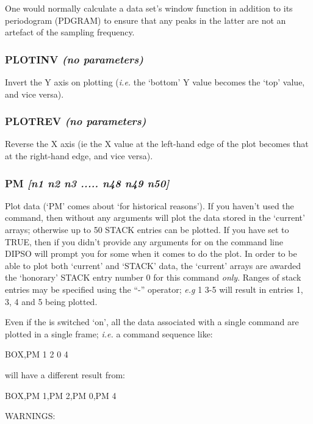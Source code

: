 \documentclass[twoside,11pt,noabs,nolof]{starlink}
\providecommand{\dipcom}[3]{\subsubsection*{\label{COM:#1}\xlabel{COM:#1}\textbf{#1} \emph{#2}}}
\begin{document}
One would normally calculate a data set's window function in addition
to its periodogram (PDGRAM) to ensure that any peaks in the latter are
not an artefact of the sampling frequency.

\dipcom{PLOTINV}{(no parameters)}{Causes the Y axis of subsequent plots to be inverted}
Invert the Y axis on plotting (\emph{i.e.} the `bottom' Y value becomes
the `top' value, and vice versa).

\dipcom{PLOTREV}{(no parameters)}{Causes the X axis of subsequent plots to be reversed}
Reverse the X axis (ie the X value at the left-hand edge of the plot
becomes that at the right-hand edge, and vice versa).

\dipcom{PM}{[n1 n2 n3 ..... n48 n49 n50]}{Plots a data array}
Plot data (`PM' comes about `for historical reasons'). If you haven't
used the   command, then   without any arguments will plot the
data stored in the `current' arrays; otherwise up to 50 STACK entries
can be plotted. If you have set   to TRUE, then if you didn't
provide any arguments for   on the command line DIPSO will prompt you
for some when it comes to do the plot. In order to be able to plot
both `current' and `STACK' data, the `current' arrays are awarded the
`honorary' STACK entry number 0 for this command \emph{only}. Ranges of
stack entries may be specified using the ``-'' operator; \emph{e.g}   1 3-5
will result in entries 1, 3, 4 and 5 being plotted.

Even if the   is switched `on', all the data associated with a single 
command are plotted in a single frame; \emph{i.e.} a command sequence like:

\begin{terminalv}
BOX,PM 1 2 0 4
\end{terminalv}

will have a different result from:

\begin{terminalv}
BOX,PM 1,PM 2,PM 0,PM 4
\end{terminalv}

WARNINGS:
\end{document}
